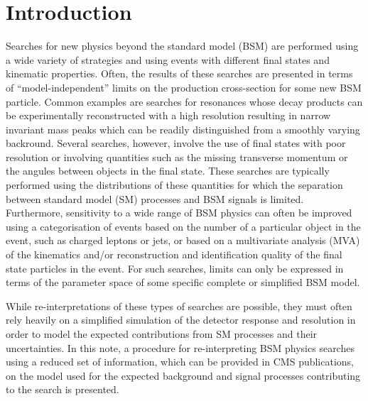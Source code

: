 \section{Introduction}
\label{sec:intro}

Searches for new physics beyond the standard model (BSM) are performed using a wide variety of 
strategies and using events with different final states and kinematic properties.  Often, 
the results of these searches are presented in terms of ``model-independent'' limits on the production 
cross-section for some new BSM particle. Common examples are searches for resonances whose decay products 
can be experimentally reconstructed with a high resolution resulting in narrow invariant mass peaks which can be readily distinguished from 
a smoothly varying backround. Several searches, however, involve the use of final states with poor resolution or involving 
quantities such as the missing transverse momentum or the angules between objects in the final state. These searches are typically performed using the 
distributions of these quantities for which the separation between standard model (SM) processes and BSM signals is limited. Furthermore, 
sensitivity to a wide range of BSM physics can often be improved using a categorisation of events based on the number of a particular 
object in the event, such as charged leptons or jets, or based on a multivariate analysis (MVA) of the kinematics and/or reconstruction and 
identification quality of the final state particles in the event. For such searches, limits can only be expressed in terms of the 
parameter space of some specific complete or simplified BSM model.

While re-interpretations of these types of searches are possible, they must often rely heavily on a simplified simulation of 
the detector response and resolution in order to model the expected contributions from SM processes and their uncertainties. 
In this note, a procedure for re-interpreting BSM physics searches using a reduced set of information, which can be provided in CMS publications, 
on the model used for the expected background and signal processes contributing to the search is presented. 


